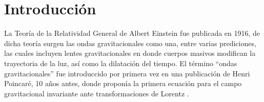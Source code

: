 
%


\newcommand{\keyword}[1]{\textit{#1}}


\section{Introducción}
	La Teor\'ia de la Relatividad General de Albert Einstein fue publicada en 1916, de dicha teor\'ia surgen las ondas gravitacionales como una, entre varias prediciones, las cuales incluyen lentes gravitacionales en donde cuerpos masivos modifican la trayectoria de la luz, as\'i como la dilataci\'on del tiempo. El t\'ermino ``ondas gravitacionales'' fue introduccido por primera vez en una publicaci\'on de Henri Poincaré, 10 a\~nos antes, donde propon\'ia la primera ecuaci\'on para el campo gravitacional invariante ante transformaciones de Lorentz \cite{straumann2012general, bassan2014advanced}.
	
	
	
	
	
		
	

